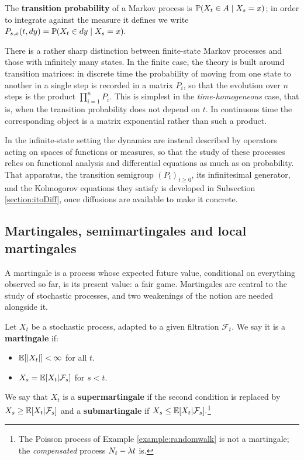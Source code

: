 The \textbf{transition probability} of a Markov process is $\mathbb{P}(X_t \in A \mid X_s = x)$; in order to integrate against the measure it defines we write $P_{s,x}(t,dy) = \mathbb{P}(X_t \in dy \mid X_s = x).$

There is a rather sharp distinction between finite-state Markov processes and those with infinitely many states. In the finite case, the theory is built around transition matrices: in discrete time the probability of moving from one state to another in a single step is recorded in a matrix $P_i$, so that the evolution over $n$ steps is the product $\prod_{i=1}^n P_i$. This is simplest in the \emph{time-homogeneous} case, that is, when the transition probability does not depend on $t$. In continuous time the corresponding object is a matrix exponential rather than such a product.

In the infinite-state setting the dynamics are instead described by operators acting on spaces of functions or measures, so that the study of these processes relies on functional analysis and differential equations as much as on probability. That apparatus, the transition semigroup $(P_t)_{t\geq0}$, its infinitesimal generator, and the Kolmogorov equations they satisfy is developed in Subsection \ref{section:itoDiff}, once diffusions are available to make it concrete.

\subsection{Martingales, semimartingales and local martingales}\label{subsec:martingales}

A martingale is a process whose expected future value, conditional on everything observed so far, is its present value: a fair game. Martingales are central to the study of stochastic processes, and two weakenings of the notion are needed alongside it.

\begin{definition}[Martingale] 
    Let $X_t$ be a stochastic process, adapted to a given filtration $\mathcal{F}_t$. We say it is a \textbf{martingale} if:
    \begin{itemize}
        \item $\mathbb{E}[|X_t|]<\infty$ for all $t.$
        \item $X_s = \mathbb{E}[X_t | \mathcal{F}_s]$ for $s<t.$
    \end{itemize}
    We say that $X_t$ is a \textbf{supermartingale} if the second condition is replaced by $X_s  \geq \mathbb{E}[X_t | \mathcal{F}_s]$ and a \textbf{submartingale} if $X_s\leq \mathbb{E}[X_t | \mathcal{F}_s].$\footnote{The Poisson process of Example \ref{example:randomwalk} is not a martingale; the \emph{compensated} process $N_t - \lambda t$ is.}
\end{definition}

